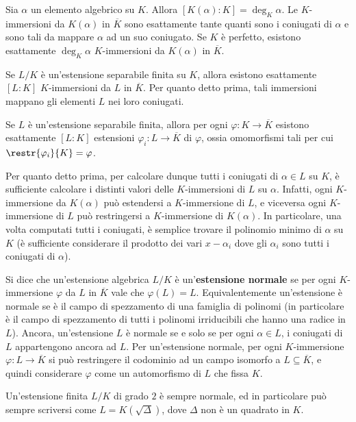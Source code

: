 \documentclass[10pt,landscape]{article}
\begin{document}
\begin{multicols}{3}
		Sia $\alpha$ un elemento algebrico su $K$. Allora
		$[K(\alpha) : K] = \deg_K \alpha$. Le
		$K$-immersioni da $K(\alpha)$ in $\overline{K}$
		sono esattamente tante quanti sono i coniugati di
		$\alpha$ e sono tali da mappare $\alpha$ ad un suo coniugato. Se $K$ è perfetto, esistono esattamente
		$\deg_K \alpha$ $K$-immersioni da $K(\alpha)$
		in $\overline{K}$. \medskip
		
		
		Se $L / K$ è un'estensione separabile finita su $K$, allora
		esistono esattamente $[L : K]$ $K$-immersioni
		da $L$ in $\overline{K}$. Per quanto detto prima,
		tali immersioni mappano gli elementi $L$ nei
		loro coniugati. \medskip
		
		
		Se $L$ è un'estensione separabile finita, allora per
		ogni $\varphi : K \to \overline{K}$ esistono
		esattamente $[L : K]$ estensioni $\varphi_i : L \to \overline{K}$ di $\varphi$, ossia omomorfismi
		tali per cui $\restr{\varphi_i}{K} = \varphi$. \medskip
		
		
		Per quanto detto prima, per calcolare dunque tutti
		i coniugati di $\alpha \in L$ su $K$, è sufficiente
		calcolare i distinti valori delle $K$-immersioni
		di $L$ su $\alpha$. Infatti, ogni $K$-immersione
		da $K(\alpha)$ può estendersi a $K$-immersione di
		$L$, e viceversa ogni $K$-immersione di $L$ può
		restringersi a $K$-immersione di $K(\alpha)$. In
		particolare, una volta computati tutti i coniugati, è semplice trovare il polinomio minimo di $\alpha$
		su $K$ (è sufficiente considerare il prodotto dei vari $x-\alpha_i$ dove gli $\alpha_i$ sono tutti i coniugati di $\alpha$). \medskip
		
		
		Si dice che un'estensione algebrica $L / K$ è un'\textbf{estensione normale}
		se per ogni $K$-immersione $\varphi$ da $L$ in $\overline{K}$
		vale che $\varphi(L) = L$. Equivalentemente
		un'estensione è normale se è il campo di spezzamento
		di una famiglia di polinomi (in particolare è il campo
		di spezzamento di tutti i polinomi irriducibili che
		hanno una radice in $L$). Ancora, un'estensione $L$
		è normale se e solo se per ogni $\alpha \in L$,
		i coniugati di $L$ appartengono ancora ad $L$.
		Per un'estensione normale, per ogni $K$-immersione
		$\varphi : L \to \overline{K}$ si può restringere
		il codominio ad un campo isomorfo a $L \subseteq \overline{K}$, e quindi considerare $\varphi$ come
		un automorfismo di $L$ che fissa $K$. \medskip
		
		
		Un'estensione finita $L/K$ di grado $2$ è sempre normale,
		ed in particolare può sempre scriversi come
		$L = K(\sqrt{\Delta})$, dove $\Delta$ non è un quadrato
		in $K$.
		

\end{multicols}
\end{document}
